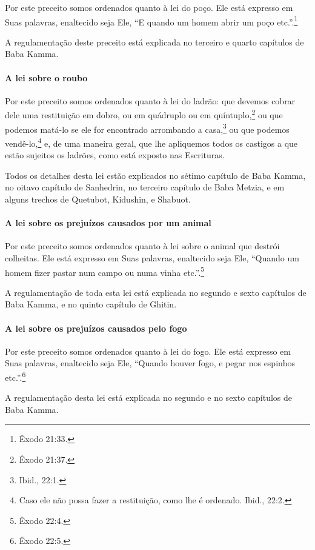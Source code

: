Por este preceito somos ordenados quanto à lei do poço. Ele está
expresso em Suas palavras, enaltecido seja Ele, ``E quando um homem
abrir um poço etc.''.\footnote{Êxodo 21:33.}

A regulamentação deste preceito está explicada no terceiro e quarto
capítulos de Baba Kamma.


\paragraph{A lei sobre o roubo}

Por este preceito somos ordenados quanto à lei do ladrão: que devemos
cobrar dele uma restituição em dobro, ou em quádruplo ou em
quíntuplo,\footnote{Êxodo 21:37.} ou que podemos matá-lo se ele for
encontrado arrombando a casa,\footnote{Ibid., 22:1.} ou que podemos
vendê-lo,\footnote{Caso ele não possa fazer a restituição, como lhe é ordenado. Ibid.,
  22:2.} e, de uma maneira geral, que lhe
apliquemos todos os castigos a que estão sujeitos os ladrões, como está
exposto nas Escrituras.

Todos os detalhes desta lei estão explicados no sétimo capítulo de Baba
Kamma, no oitavo capítulo de Sanhedrin, no terceiro capítulo de Baba
Metzia, e em alguns trechos de Quetubot, Kidushin, e Shabuot.

\paragraph{A lei sobre os prejuízos causados por um animal}

Por este preceito somos ordenados quanto à lei sobre o animal que
destrói colheitas. Ele está expresso em Suas palavras, enaltecido seja
Ele, ``Quando um homem fizer pastar num campo ou numa vinha etc.''.\footnote{Êxodo 22:4.}

A regulamentação de toda esta lei está explicada no segundo e sexto
capítulos de Baba Kamma, e no quinto capítulo de Ghitin.


\paragraph{A lei sobre os prejuízos causados pelo fogo}

Por este preceito somos ordenados quanto à lei do fogo. Ele está
expresso em Suas palavras, enaltecido seja Ele, ``Quando houver fogo, e
pegar nos espinhos etc.''.\footnote{Êxodo 22:5.}

A regulamentação desta lei está explicada no segundo e no sexto
capítulos de Baba Kamma.

